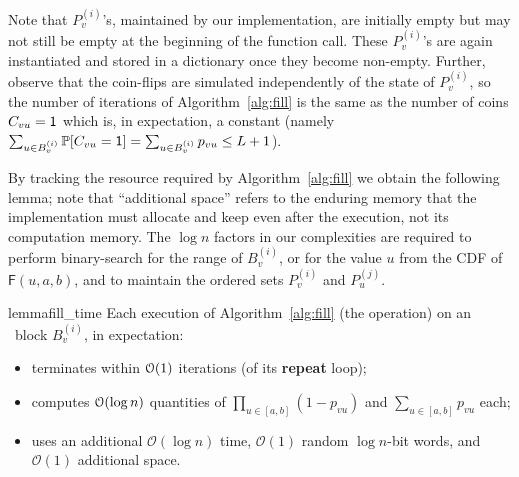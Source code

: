 Note that $P_v^{(i)}$'s, maintained by our implementation, are initially empty but may not still be empty at the beginning of the  function call. These $P_v^{(i)}$'s are again instantiated and stored in a dictionary once they become non-empty.
Further, observe that the coin-flips are simulated independently of the state of $P_v^{(i)}$, so the number of iterations of Algorithm~\ref{alg:fill} is the same as the number of coins $C_{vu} = \mathsf{1}$ which is, in expectation, a constant (namely $\sum_{u\in B^{(i)}_v} \mathbb P[C_{vu}=\mathsf{1}] = \sum_{u\in B^{(i)}_v} p_{vu} \leq L+1$). %



By tracking the resource required by Algorithm~\ref{alg:fill} we obtain the following lemma; note that ``additional space'' refers to the enduring memory that the implementation must allocate and keep even after the execution, not its computation memory. The $\log n$ factors in our complexities are required to perform binary-search for the range of $B^{(i)}_v$, or for the value $u$ from the CDF of $\mathsf{F}(u,a,b)$, and to maintain the ordered sets $P_v^{(i)}$ and $P_u^{(j)}$.

\begin{restatable}{lemma}{fill_time}
\label{lem:fill_time}
Each execution of Algorithm~\ref{alg:fill} (the  operation) on an \unfilled~block $B^{(i)}_v$, in expectation:
\begin{itemize}
\item terminates within $\mathcal{O}(1)$ iterations (of its \textup{\textbf{repeat}} loop);
\item computes $\mathcal{O}(\log n)$ quantities of $\prod_{u \in [a,b]} (1-p_{vu})$ and $\sum_{u\in[a,b]} p_{vu}$ each;
\item uses an additional $\mathcal O(\log n)$ time, $\mathcal O(1)$ random $\log n$-bit words, and $\mathcal O(1)$ additional space.
\end{itemize}
\end{restatable}

